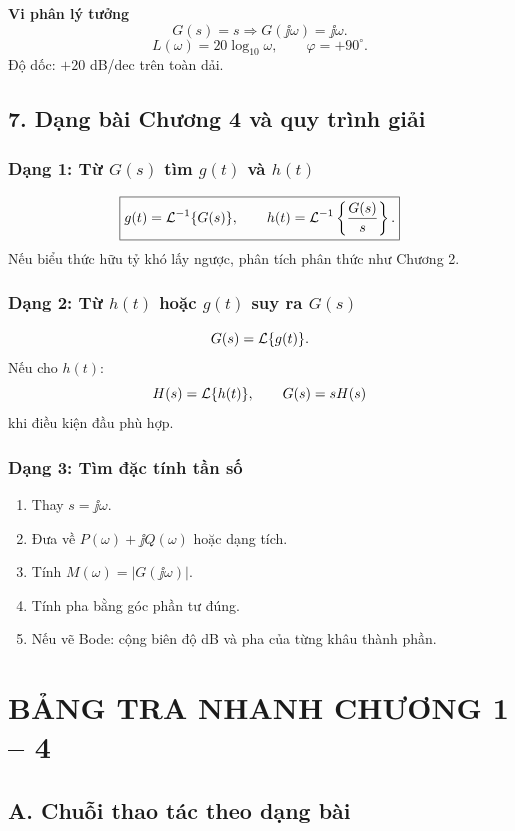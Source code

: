 \textbf{Vi phân lý tưởng}
\[
G(s)=s
\Longrightarrow
G(\jj\omega)=\jj\omega.
\]
\[
\boxed{
L(\omega)=20\log_{10}\omega,
\qquad
\varphi=+90^\circ.
}
\]
Độ dốc: $+20$ dB/dec trên toàn dải.

\subsection*{7. Dạng bài Chương 4 và quy trình giải}

\subsubsection*{Dạng 1: Từ $G(s)$ tìm $g(t)$ và $h(t)$}

\[
\boxed{
g(t)=\mathcal{L}^{-1}\{G(s)\},
\qquad
h(t)=\mathcal{L}^{-1}\left\{\frac{G(s)}s\right\}.
}
\]
Nếu biểu thức hữu tỷ khó lấy ngược, phân tích phân thức như Chương 2.

\subsubsection*{Dạng 2: Từ $h(t)$ hoặc $g(t)$ suy ra $G(s)$}

\[
G(s)=\mathcal{L}\{g(t)\}.
\]
Nếu cho $h(t)$:
\[
H(s)=\mathcal{L}\{h(t)\},
\qquad
G(s)=sH(s)
\]
khi điều kiện đầu phù hợp.

\subsubsection*{Dạng 3: Tìm đặc tính tần số}

\begin{enumerate}[leftmargin=1.9em,itemsep=0.2em]
  \item Thay $s=\jj\omega$.
  \item Đưa về $P(\omega)+\jj Q(\omega)$ hoặc dạng tích.
  \item Tính $M(\omega)=|G(\jj\omega)|$.
  \item Tính pha bằng góc phần tư đúng.
  \item Nếu vẽ Bode: cộng biên độ dB và pha của từng khâu thành phần.
\end{enumerate}

\clearpage
\section*{BẢNG TRA NHANH CHƯƠNG 1 -- 4}

\subsection*{A. Chuỗi thao tác theo dạng bài}

